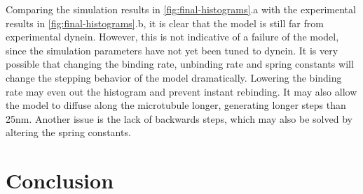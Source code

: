 \documentclass[
11pt, %
english, %
singlespacing, %
headsepline, %
chapterinoneline, %
]{MastersDoctoralThesis} %
\begin{document}
Comparing the simulation results in \ref{fig:final-histograms}.a with the experimental results in \ref{fig:final-histograms}.b, it is clear that the model is still far from experimental dynein. However, this is not indicative of a failure of the model, since the simulation parameters have not yet been tuned to dynein. It is very possible that changing the binding rate, unbinding rate and spring constants will change the stepping behavior of the model dramatically. Lowering the binding rate may even out the histogram and prevent instant rebinding. It may also allow the model to diffuse along the microtubule longer, generating longer steps than 25nm. Another issue is the lack of backwards steps, which may also be solved by altering the spring constants.\\



\newpage
\chapter{Conclusion}
\label{chap:Conclusion}

\end{document}
